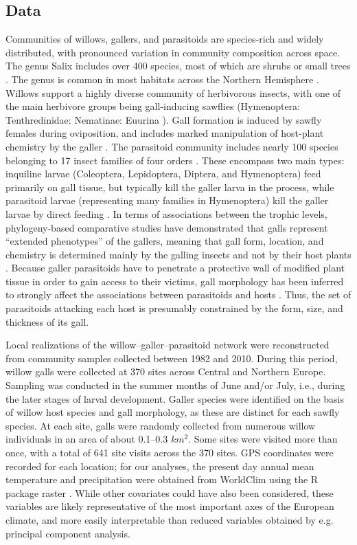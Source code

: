 \documentclass[12pt]{article}
\begin{document}
\subsection*{Data}  

Communities of willows, gallers, and parasitoids are species-rich and
widely distributed, with pronounced variation in community composition across
space. The genus Salix includes over 400 species, most of which are shrubs or
small trees \citep{Argus1997}. The genus is common in most habitats across the
Northern Hemisphere \citep{Skvortsov1999}. Willows support a highly diverse
community of herbivorous insects, with one of the main herbivore groups being
gall-inducing sawflies (Hymenoptera: Tenthredinidae: Nematinae: Euurina
\citep{Kopelke1999}). Gall formation is induced by sawfly females during
oviposition, and includes marked manipulation of host-plant chemistry by the
galler \citep{Nyman2000}. The parasitoid community includes nearly
100 species belonging to 17 insect families of four orders
\citep{Kopelke2000}. These encompass two main types: inquiline larvae
(Coleoptera, Lepidoptera, Diptera, and Hymenoptera) feed primarily on gall
tissue, but typically kill the galler larva in the process, while parasitoid
larvae (representing many families in Hymenoptera) kill the galler larvae by
direct feeding \citep{Kopelke2003}. In terms of associations between the
trophic levels, phylogeny-based comparative studies have demonstrated that
galls represent ``extended phenotypes'' of the gallers, meaning that gall form,
location, and chemistry is determined mainly by the galling insects and not by
their host plants \citep{Nyman2000}. Because galler parasitoids have to
penetrate a protective wall of modified plant tissue in order to gain access
to their victims, gall morphology has been inferred to strongly affect the
associations between parasitoids and hosts \citep{Nyman2007}. Thus, the set of
parasitoids attacking each host is presumably constrained by the form,
size, and thickness of its gall.

Local realizations of the willow–galler–parasitoid network were reconstructed
from community samples collected between 1982 and 2010. During this period,
willow galls were collected at 370 sites across Central and Northern Europe.
Sampling was conducted in the summer months of June and/or July, i.e., during
the later stages of larval development. Galler species were identified on the
basis of willow host species and gall morphology, as these are distinct for
each sawfly species. At each site, galls were randomly collected from numerous
willow individuals in an area of about 0.1–0.3 $km^2$. Some sites were visited
more than once, with a total of 641 site visits across the 370 sites. GPS
coordinates were recorded for each location; for our analyses, the present day
annual mean temperature and precipitation were obtained from WorldClim using
the R package raster \citep{Hijmans2015}. While other covariates could have
also been considered, these variables are likely representative of the most
important axes of the European climate, and more easily interpretable than
reduced variables obtained by e.g. principal component analysis.
\end{document}
